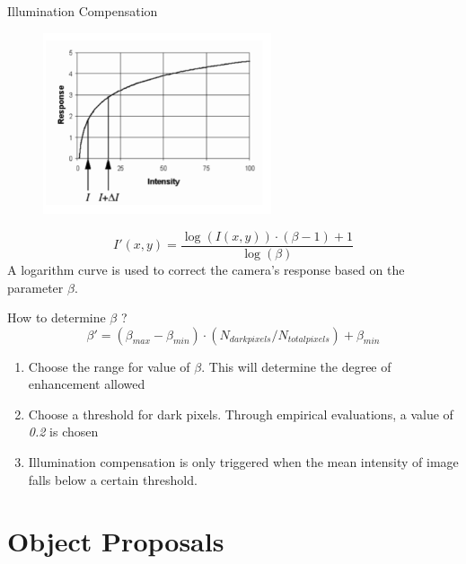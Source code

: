 \documentclass[13pt]{beamer}
\begin{document}
\begin{frame}{Illumination Compensation}

  \begin{figure}[ht]
      \centering
      \includegraphics[width=0.6\textwidth, height=0.3\textwidth]{figs/logcurve.png}
  \end{figure}

  \[
    I'(x,y) = \frac{\log(I(x,y)) \cdot (\beta -1) + 1}{\log(\beta)}
  \]
  A logarithm curve is used to correct the camera's response based on the
  parameter $\beta$.
\end{frame}

\begin{frame}{How to determine $\beta$ ?}
  \[
    \beta' = (\beta_{max}- \beta_{min}) \cdot (N_{darkpixels} / N_{totalpixels})
    + \beta_{min}
  \]
  \begin{enumerate}
    \item Choose the range for value of $\beta$. This will determine the degree
      of enhancement allowed
    \item Choose a threshold for dark pixels. Through empirical evaluations, a
      value of \textit{0.2} is chosen
    \item Illumination compensation is only triggered when the mean intensity of
      image falls below a certain threshold.
  \end{enumerate}
\end{frame}

\section{Object Proposals}
\end{document}
